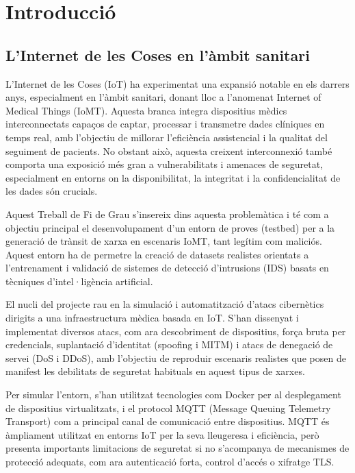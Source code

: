 \chapter{Introducció}

\section{L'Internet de les Coses en l'àmbit sanitari}
L’Internet de les Coses (IoT) ha experimentat una expansió notable en els darrers anys, especialment en l’àmbit sanitari, donant lloc a l’anomenat Internet of Medical Things (IoMT). Aquesta branca integra dispositius mèdics interconnectats capaços de captar, processar i transmetre dades clíniques en temps real, amb l’objectiu de millorar l’eficiència assistencial i la qualitat del seguiment de pacients. No obstant això, aquesta creixent interconnexió també comporta una exposició més gran a vulnerabilitats i amenaces de seguretat, especialment en entorns on la disponibilitat, la integritat i la confidencialitat de les dades són crucials.

Aquest Treball de Fi de Grau s’insereix dins aquesta problemàtica i té com a objectiu principal el desenvolupament d’un entorn de proves (testbed) per a la generació de trànsit de xarxa en escenaris IoMT, tant legítim com maliciós. Aquest entorn ha de permetre la creació de datasets realistes orientats a l’entrenament i validació de sistemes de detecció d’intrusions (IDS) basats en tècniques d’intel·ligència artificial.

El nucli del projecte rau en la simulació i automatització d’atacs cibernètics dirigits a una infraestructura mèdica basada en IoT. S'han dissenyat i implementat diversos atacs, com ara descobriment de dispositius, força bruta per credencials, suplantació d’identitat (spoofing i MITM) i atacs de denegació de servei (DoS i DDoS), amb l’objectiu de reproduir escenaris realistes que posen de manifest les debilitats de seguretat habituals en aquest tipus de xarxes.

Per simular l’entorn, s’han utilitzat tecnologies com Docker per al desplegament de dispositius virtualitzats, i el protocol MQTT (Message Queuing Telemetry Transport) com a principal canal de comunicació entre dispositius. MQTT és àmpliament utilitzat en entorns IoT per la seva lleugeresa i eficiència, però presenta importants limitacions de seguretat si no s’acompanya de mecanismes de protecció adequats, com ara autenticació forta, control d’accés o xifratge TLS.

